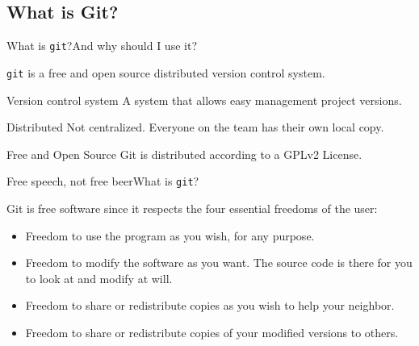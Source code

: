 \documentclass[dvipsnames, usenames]{beamer}
\newcommand{\spacepls}{\vspace{1.5Ex}}
\begin{document}

\subsection{What is Git?} %
\label{sub:what_is_git}

\begin{frame}{What is \texttt{git}?}{And why should I use it?}

	\spacepls

	\texttt{git} is a {\color{OliveGreen}free and open source} \alert{distributed} {\color{Blue}version control system}. \pause

	\bigskip

	\begin{block}{Version control system}	
		A system that allows easy management project versions.
	\end{block} \pause

	\bigskip

	\begin{alertblock}{Distributed}	
		Not centralized. Everyone on the team has their own local copy.
	\end{alertblock} \pause

	\bigskip

	\begin{exampleblock}{Free and Open Source}	
		Git is distributed according to a GPLv2 License.
	\end{exampleblock}
	
\end{frame}


\begin{frame}{Free speech, not free beer}{What is \texttt{git}?}

	Git is free software since it respects the four essential freedoms of the user: \pause

	\begin{itemize}
		\item Freedom to use the program as you wish, for any purpose. \pause
		\item Freedom to modify the software as you want. The source code is there for you to look at and modify at will. \pause
		\item Freedom to share or redistribute copies as you wish to help your neighbor. \pause
		\item Freedom to share or redistribute copies of your modified versions to others.
	\end{itemize}
	
\end{frame}
\end{document}
